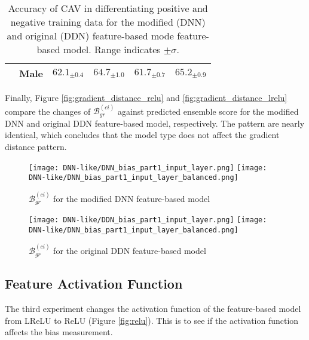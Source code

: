 \begin{table}[H]
\begin{tabular}{|c|c|cc|cc|}
                          & Male                              & \multicolumn{1}{c|}{$62.1_{\pm 0.4}$}                     & $64.7_{\pm 1.0}$                     & \multicolumn{1}{c|}{$61.7_{\pm 0.7}$}                     & $65.2_{\pm 0.9}$                     \\ \hline
    \end{tabular}
    \caption{Accuracy of CAV in differentiating positive and negative training data for the modified (DNN) and original (DDN) feature-based mode feature-based model. Range indicates $\pm \sigma$.}
    \label{tab:CAV_accuracy_dnn_like}
\end{table}

Finally, Figure \ref{fig:gradient_distance_relu} and \ref{fig:gradient_distance_lrelu} compare the changes of $\mathcal{B}^{(ci)}_{gr}$ against predicted ensemble score for the modified DNN and original DDN feature-based model, respectively. The pattern are nearly identical, which concludes that the model type does not affect the gradient distance pattern.

\begin{figure}[H]
    \centering
    \begin{minipage}[t]{0.48\textwidth}
        \centering
        \texttt{[image: DNN-like/DNN\_bias\_part1\_input\_layer.png]}
        \hfill
        \texttt{[image: DNN-like/DNN\_bias\_part1\_input\_layer\_balanced.png]}
        \caption{$\mathcal{B}^{(ci)}_{gr}$ for the modified DNN feature-based model}
        \label{fig:gradient_distance_dnn_like_modified}
    \end{minipage}
    \hfill
    \begin{minipage}[t]{0.48\textwidth}
        \centering
        \texttt{[image: DNN-like/DDN\_bias\_part1\_input\_layer.png]}
        \hfill
        \texttt{[image: DNN-like/DNN\_bias\_part1\_input\_layer\_balanced.png]}
        \caption{$\mathcal{B}^{(ci)}_{gr}$ for the original DDN feature-based model}
        \label{fig:gradient_distance_dnn_like_original}
    \end{minipage}
\end{figure}

\subsection{Feature Activation Function} \label{sec:feature_activation_function}
The third experiment changes the activation function of the feature-based model from LReLU to ReLU (Figure \ref{fig:relu}). This is to see if the activation function affects the bias measurement.

